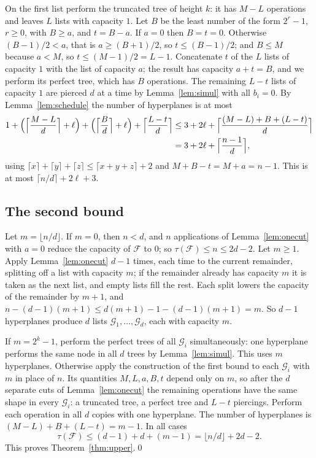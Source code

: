 \documentclass[11pt]{amsart}
\theoremstyle{remark}
\newcommand{\F}{\mathcal F}
\newcommand{\G}{\mathcal G}
\newcommand{\ceil}[1]{\lceil #1\rceil}
\newcommand{\floor}[1]{\lfloor #1\rfloor}
\begin{document}
On the first list perform the truncated tree of height $k$: it has $M-L$ operations and leaves $L$ lists with capacity
$1$. Let $B$ be the least number of the form $2^r-1$, $r\ge0$, with $B\ge a$, and $t=B-a$. If $a=0$ then $B=t=0$.
Otherwise $(B-1)/2<a$, that is $a\ge(B+1)/2$, so $t\le(B-1)/2$; and $B\le M$ because $a<M$, so $t\le(M-1)/2=L-1$.
Concatenate $t$ of the $L$ lists of capacity $1$ with the list of capacity $a$; the result has capacity $a+t=B$, and we
perform its perfect tree, which has $B$ operations. The remaining $L-t$ lists of capacity $1$ are pierced $d$ at a time
by Lemma~\ref{lem:simul} with all $b_i=0$. By Lemma~\ref{lem:schedule} the number of hyperplanes is at most
\begin{align*}
1+\Bigl(\Bigl\lceil\frac{M-L}d\Bigr\rceil+\ell\Bigr)+\Bigl(\Bigl\lceil\frac Bd\Bigr\rceil+\ell\Bigr)+\Bigl\lceil\frac{L-t}d\Bigr\rceil
&\le 3+2\ell+\Bigl\lceil\frac{(M-L)+B+(L-t)}d\Bigr\rceil\\
&=3+2\ell+\Bigl\lceil\frac{n-1}d\Bigr\rceil,
\end{align*}
using $\ceil x+\ceil y+\ceil z\le\ceil{x+y+z}+2$ and $M+B-t=M+a=n-1$. This is at most $\ceil{n/d}+2\ell+3$.

\subsection*{The second bound}
Let $m=\floor{n/d}$. If $m=0$, then $n<d$, and $n$ applications of Lemma~\ref{lem:onecut} with $a=0$ reduce the
capacity of $\F$ to $0$; so $\tau(\F)\le n\le 2d-2$. Let $m\ge1$. Apply Lemma~\ref{lem:onecut} $d-1$ times, each time to
the current remainder, splitting off a list with capacity $m$; if the remainder already has capacity $m$ it is taken as
the next list, and empty lists fill the rest. Each split lowers the capacity of the remainder by $m+1$, and
$n-(d-1)(m+1)\le d(m+1)-1-(d-1)(m+1)=m$. So $d-1$ hyperplanes produce $d$ lists $\G_1,\dots,\G_d$, each with capacity
$m$.

If $m=2^k-1$, perform the perfect trees of all $\G_i$ simultaneously: one hyperplane performs the same node in all
$d$ trees by Lemma~\ref{lem:simul}. This uses $m$ hyperplanes. Otherwise apply the construction of the first bound to
each $\G_i$ with $m$ in place of $n$. Its quantities $M,L,a,B,t$ depend only on $m$, so after the $d$ separate cuts of
Lemma~\ref{lem:onecut} the remaining operations have the same shape in every $\G_i$: a truncated tree, a perfect tree
and $L-t$ piercings. Perform each operation in all $d$ copies with one hyperplane. The number of hyperplanes is
$(M-L)+B+(L-t)=m-1$. In all cases
\[
\tau(\F)\le (d-1)+d+(m-1)=\floor{n/d}+2d-2.
\]
This proves Theorem~\ref{thm:upper}.\qed
\end{document}
